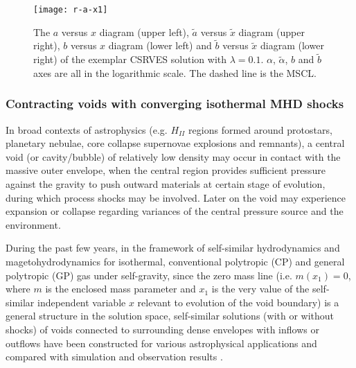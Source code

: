 \documentclass[fleqn,usenatbib]{mnras}
\begin{document}
\begin{figure}
\centering
\texttt{[image: r-a-x1]}
\caption{The $a$ versus $x$ diagram (upper left), $\widetilde{a}$ versus $\widetilde{x}$ diagram (upper right), $b$ versus $x$ diagram (lower left) and $\widetilde{b}$ versus $\widetilde{x}$ diagram (lower right) of the exemplar CSRVES solution with $\lambda=0.1$. $\alpha$, $\widetilde{\alpha}$, $b$ and $\widetilde{b}$ axes are all in the logarithmic scale. The dashed line is the MSCL.}
\label{fa4}
\end{figure}

\subsubsection{Contracting voids with converging isothermal MHD shocks}
In broad contexts of astrophysics (e.g. $H_{II}$ regions formed around protostars, planetary nebulae, core collapse supernovae explosions and remnants), a central void (or cavity/bubble) of relatively low density may occur in contact with the massive outer envelope, when the central region provides sufficient pressure against the gravity to push outward materials at certain stage of evolution, during which process shocks may be involved. Later on the void may experience expansion or collapse regarding variances of the central pressure source and the environment. 

During the past few years, in the framework of self-similar hydrodynamics and magetohydrodynamics for isothermal, conventional polytropic (CP) and general polytropic (GP) gas under self-gravity, since the zero mass line (i.e. $m(x_{1})=0$, where $m$ is the enclosed mass parameter and $x_{1}$ is the very value of the self-similar independent variable $x$ relevant to evolution of the void boundary) is a general structure in the solution space, self-similar solutions (with or without shocks) of voids connected to surrounding dense envelopes with inflows or outflows have been constructed for various astrophysical applications and compared with simulation and observation results \citep{hu2008self, lou2008self, lou2012dynamic, lou2010general, lou2009dynamic}.
\end{document}
